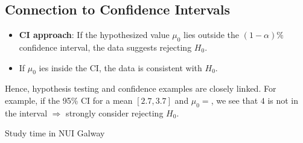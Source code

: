 \documentclass[10pt]{extarticle}
\begin{document}
\subsection{Connection to Confidence Intervals}
\begin{itemize}
    \item \textbf{CI approach}: If the hypothesized value $\mu_0$ lies outside the $(1-\alpha)\%$ confidence interval, the data suggests rejecting $H_0$.
    \item If $\mu_0$ ies inside the CI, the data is consistent with $H_0$.
\end{itemize}
Hence, hypothesis testing and confidence examples are closely linked. For example, if the 95\% CI for a mean $[2.7, 3.7]$ and $\mu_0 = $, we see that $4$ is not in the interval $\Rightarrow$ strongly consider rejecting $H_0$. 
\begin{examplebox}{Study time in NUI Galway}{}
\end{examplebox}
\end{document}
